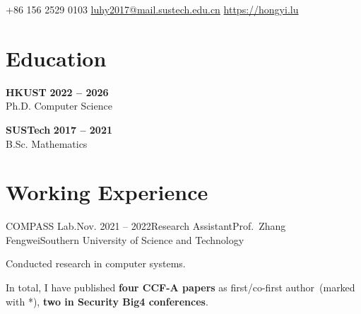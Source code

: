 \documentclass{resume}
\begin{document}
\begin{center}
	\contact
	{+86 156 2529 0103}
	{\href{mailto://luhy2017@mail.sustech.edu.cn}{luhy2017@mail.sustech.edu.cn}}
	{\href{https://hongyi.lu}{https://hongyi.lu}}
\end{center}

\section{Education}
\begin{content}
	{\bf HKUST}
	\hfill {\bf 2022
		-- 2026}
	\\ {Ph.D. Computer Science}

	{\bf SUSTech} \hfill {\bf 2017 --
		2021} \\
	{B.Sc. Mathematics} \hfill

	\sectionlineskip
\end{content}

\section{Working Experience}
\begin{content}

	\begin{position}{COMPASS Lab.}{Nov. 2021 -- 2022}{Research
			Assistant}{Prof.~Zhang Fengwei}{Southern University of Science and
			Technology}
		\item Conducted research in computer systems.
	\end{position}

	\sectionlineskip
\end{content}
\vspace{-3\medskipamount}

\noindent
\renewcommand{\refname}{Publications}   %
\nocite{*}
\sectionlineskip

In total, I have published \textbf{four CCF-A papers} as first/co-first author~(marked with *), \textbf{two in Security Big4 conferences}.
\end{document}
